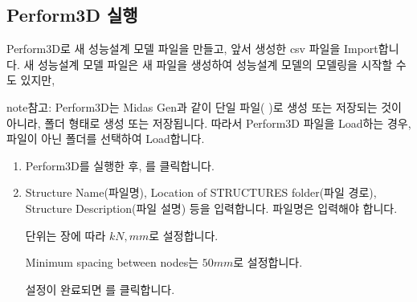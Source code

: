 \documentclass[a4paper,11pt,korean,openany,oneside]{sphinxmanual}
\begin{document}
\subsection{Perform\sphinxhyphen{}3D 실행}
\label{\detokenize{3_import:perform-3d}}
\sphinxAtStartPar
Perform\sphinxhyphen{}3D로 새 성능설계 모델 파일을 만들고, 앞서 생성한 csv 파일을 Import합니다. 
새 성능설계 모델 파일은 새 파일을 생성하여 성능설계 모델의 모델링을 시작할 수도 있지만,

\begin{sphinxadmonition}{note}{참고:}
\sphinxAtStartPar
Perform\sphinxhyphen{}3D는 Midas Gen과 같이 단일 파일(  )로 생성 또는 저장되는 것이 아니라, 폴더 형태로 생성 또는 저장됩니다.
따라서 Perform\sphinxhyphen{}3D 파일을 Load하는 경우, 파일이 아닌 폴더를 선택하여 Load합니다.
\end{sphinxadmonition}

\begin{sphinxShadowBox}
\begin{enumerate}
%
\item {} 
\sphinxAtStartPar
Perform\sphinxhyphen{}3D를 실행한 후, 를 클릭합니다.

\begin{center}
\noindent{}
\end{center}

\newpage

\item {} 
\sphinxAtStartPar
Structure Name(파일명), Location of STRUCTURES folder(파일 경로), Structure Description(파일 설명) 등을 입력합니다.
파일명은  입력해야 합니다.

\begin{center}
\noindent{}
\end{center}

\sphinxAtStartPar
단위는 {\hyperref[\detokenize{1_unit_setting::doc}]{}} 장에 따라 \(kN, mm\)로 설정합니다.

\sphinxAtStartPar
Minimum spacing between nodes는 \(50 mm\)로 설정합니다.

\sphinxAtStartPar
설정이 완료되면 를 클릭합니다.

\end{enumerate}
\end{sphinxShadowBox}
\end{document}
